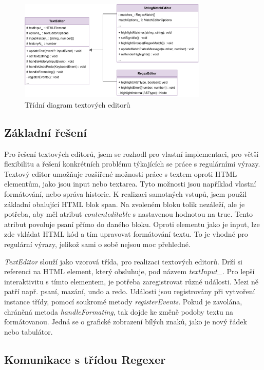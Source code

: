 \begin{figure}[!h]
	\centering
	\includegraphics[width=0.8\textwidth]{Figures/TextEditor.pdf}
	\caption{Třídní diagram textových editorů}
	\label{fig:TextEditor}
\end{figure} 

\subsection*{Základní řešení}

Pro řešení textových editorů, jsem se rozhodl pro vlastní implementaci, pro větší flexibilitu a řešení konkrétních problému týkajících se práce s regulárními výrazy.
Textový editor umožňuje rozšířené možnosti práce s textem oproti HTML elementům, jako jsou input nebo textarea.
Tyto možnosti jsou například vlastní formátování, nebo správa historie. 
K realizaci samotných vstupů, jsem použil základní obalující HTML blok span.
Na zvoleném bloku tolik nezáleží, ale je potřeba, aby měl atribut \textit{contenteditable} s nastavenou hodnotou na true.
Tento atribut povoluje psaní přímo do daného bloku. 
Oproti elementu jako je input, lze zde vkládat HTML kód a tím upravovat formátování textu.
To je vhodné pro regulární výrazy, jelikož sami o sobě nejsou moc přehledné.

\textit{TextEditor} slouží jako vzorová třída, pro realizaci textových editorů.
Drží si referenci na HTML element, který obsluhuje, pod názvem \textit{textInput\_}. 
Pro lepší interaktivitu s tímto elementem, je potřeba zaregistrovat různé události.
Mezi ně patří např. psaní, mazání, undo a redo. 
Události jsou registrovány při vytvoření instance třídy, pomocí soukromé metody \textit{registerEvents}.
Pokud je zavolána, chráněná metoda \textit{handleFormating}, tak dojde ke změně podoby textu na formátovanou.
Jedná se o grafické zobrazení bílých znaků, jako je nový řádek nebo tabulátor.

\subsection*{Komunikace s třídou Regexer}

